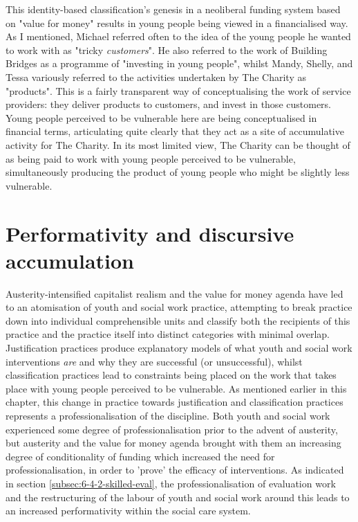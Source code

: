 This identity-based classification's genesis in a neoliberal funding system based on "value for money" results in young people being viewed in a financialised way. As I mentioned, Michael referred often to the idea of the young people he wanted to work with as "tricky \emph{customers}". He also referred to the work of Building Bridges as a programme of "investing in young people", whilst Mandy, Shelly, and Tessa variously referred to the activities undertaken by The Charity as "products". This is a fairly transparent way of conceptualising the work of service providers: they deliver products to customers, and invest in those customers. Young people perceived to be vulnerable here are being conceptualised in financial terms, articulating quite clearly that they act as a site of accumulative activity for The Charity. In its most limited view, The Charity can be thought of as being paid to work with young people perceived to be vulnerable, simultaneously producing the product of young people who might be slightly less vulnerable.

\section{Performativity and discursive accumulation}
\label{sec: 6-7-performativity}
Austerity-intensified capitalist realism and the value for money agenda have led to an atomisation of youth and social work practice, attempting to break practice down into individual comprehensible units and classify both the recipients of this practice and the practice itself into distinct categories with minimal overlap. Justification practices produce explanatory models of what youth and social work interventions \emph{are} and why they are successful (or unsuccessful), whilst classification practices lead to constraints being placed on the work that takes place with young people perceived to be vulnerable. As mentioned earlier in this chapter, this change in practice towards justification and classification practices represents a professionalisation of the discipline. Both youth and social work experienced some degree of professionalisation prior to the advent of austerity, but austerity and the value for money agenda brought with them an increasing degree of conditionality of funding which increased the need for professionalisation, in order to 'prove' the efficacy of interventions. As indicated in section \ref{subsec:6-4-2-skilled-eval}, the professionalisation of evaluation work and the restructuring of the labour of youth and social work around this leads to an increased performativity within the social care system. 

